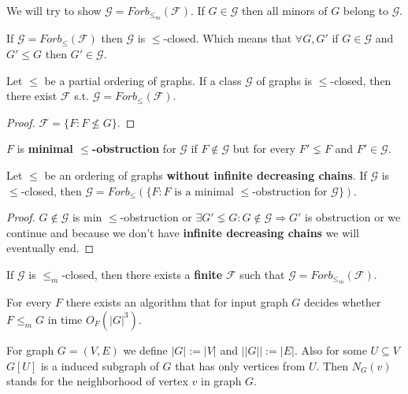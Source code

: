 We will try to show $\mathcal{G} = Forb_{\leq_{m}} (\mathcal{F})$. If $G \in \mathcal{G}$ then all minors of $G$ belong to $\mathcal{G}$.

\begin{observ}
	If $\mathcal{G} = Forb_{\leq}(\mathcal{F})$ then $\mathcal{G}$ is $\leq$-closed. Which means that $\forall G,G'$ if $G \in \mathcal{G}$ and $G' \leq G$ then $G' \in \mathcal{G}$.
\end{observ}

\begin{lemma}
	Let $\leq$ be a partial ordering of graphs. If a class $\mathcal{G}$ of graphs is $\leq$-closed, then there exist $\mathcal{F}$ s.t. $\mathcal{G} = Forb_{\leq}(\mathcal{F})$.
\end{lemma}

\begin{proof}
	$\mathcal{F} = \{F : F \nleq G\}$.
\end{proof}

\begin{defn}
	$F$ is \textbf{minimal $\leq$-obstruction} for $\mathcal{G}$ if $F \notin \mathcal{G}$ but for every $F' \lneq F$ and $F' \in \mathcal{G}$.
\end{defn}

\begin{lemma}
	Let $\leq$ be an ordering of graphs \textbf{without infinite decreasing chains}. If $\mathcal{G}$ is $\leq$-closed, then $\mathcal{G} = Forb_{\leq}(\{F : F \text{ is a minimal } \leq\text{-obstruction for } \mathcal{G}\})$.
\end{lemma}

\begin{proof}
	$G \notin \mathcal{G}$ is min $\leq$-obstruction or $\exists G' \lneq G : G \notin \mathcal{G} \Rightarrow G'$ is obstruction or we continue and because we don't have \textbf{infinite decreasing chains} we will eventually end.
\end{proof}

If $\mathcal{G}$ is $\leq_{m}$-closed, then there exists a \textbf{finite} $\mathcal{F}$ such that $\mathcal{G} = Forb_{\leq_{m}}(\mathcal{F})$.

\begin{thm}
	For every $F$ there exists an algorithm that for input graph $G$ decides whether $F \leq_{m} G$ in time $O_{F}(|G|^{3})$.
\end{thm}

\begin{defn}
	For graph $G = (V,E)$ we define $|G| := |V|$ and $||G|| := |E|$. Also for some $U \subseteq V$ $G[U]$ is a induced subgraph of $G$ that has only vertices from $U$. Then $N_{G}(v)$ stands for the neighborhood of vertex $v$ in graph $G$.
\end{defn}

